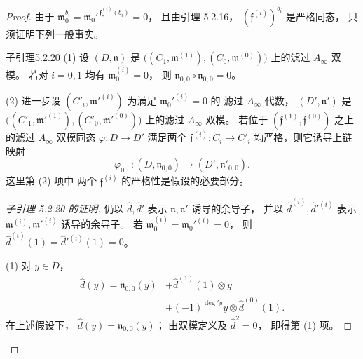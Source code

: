 \begin{proof}
由于
$\mathfrak m_0^{b_i}
=\mathfrak m_0'^{\,\mathfrak f^{(i)}_*(b_i)}=0$，
且由引理 5.2.16，
$(\mathfrak f^{(i)})^{b_i}$ 是严格同态，
只须证明下列一般事实。

\begin{statement}{子引理}{5.2.20}\label{sublem:5-2-20}
\textup{(1)} 设 $(D,\mathfrak n)$ 是
$\bigl((C_1,\mathfrak m^{(1)}),
(C_0,\mathfrak m^{(0)})\bigr)$
上的滤过 $A_\infty$ 双模。
若对 $i=0,1$ 均有
$\mathfrak m_0^{(i)}=0$，
则 $\mathfrak n_{0,0}\circ\mathfrak n_{0,0}=0$。

\textup{(2)} 进一步设 $(C'_i,\mathfrak m'^{(i)})$
为满足 $\mathfrak m_0'^{(i)}=0$ 的
滤过 $A_\infty$ 代数，
$(D',\mathfrak n')$ 是
$\bigl((C'_1,\mathfrak m'^{(1)}),
(C'_0,\mathfrak m'^{(0)})\bigr)$
上的滤过 $A_\infty$ 双模。
若位于
$(\mathfrak f^{(1)},\mathfrak f^{(0)})$
之上的滤过 $A_\infty$ 双模同态
$\varphi:D\to D'$ 满足两个
$\mathfrak f^{(i)}:C_i\to C'_i$
均严格，则它诱导上链映射
\[
\varphi_{0,0}:(D,\mathfrak n_{0,0})
\longrightarrow(D',\mathfrak n'_{0,0}).
\]
这里第 \textup{(2)} 项中
两个 $\mathfrak f^{(i)}$ 的严格性是假设的必要部分。
\end{statement}

\begin{proof}[子引理 5.2.20 的证明]
仍以 $\widehat d,\widehat d'$ 表示
$\mathfrak n,\mathfrak n'$ 诱导的余导子，
并以 $\widehat d^{(i)},\widehat d'^{(i)}$
表示 $\mathfrak m^{(i)},\mathfrak m'^{(i)}$
诱导的余导子。
若 $\mathfrak m_0^{(i)}=\mathfrak m_0'^{(i)}=0$，
则
$\widehat d^{(i)}(1)
=\widehat d'^{(i)}(1)=0$。

\textup{(1)} 对 $y\in D$，
\[
\begin{aligned}
\widehat d(y)
=\mathfrak n_{0,0}(y)
&+\widehat d^{(1)}(1)\otimes y\\
&+(-1)^{\deg' y}
y\otimes\widehat d^{(0)}(1).
\end{aligned}
\]
在上述假设下，
$\widehat d(y)=\mathfrak n_{0,0}(y)$；
由双模定义及 $\widehat d^2=0$，
即得第 \textup{(1)} 项。


\end{proof}
\end{proof}
